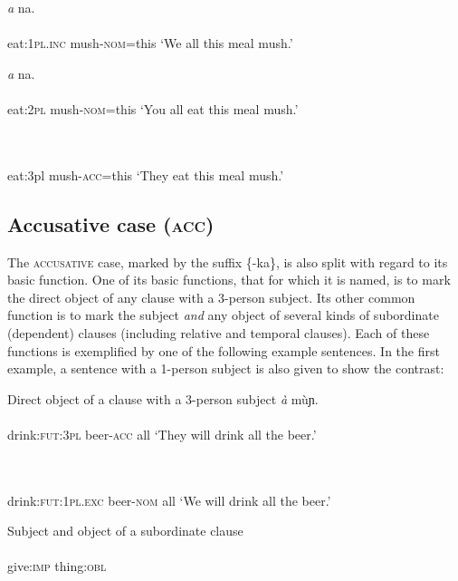 \ea\label{ex:}
\textit{a} na. \\
    \\
eat:\textsc{1pl.inc}   mush-\textsc{nom}=this
\glt ‘We all this meal mush.’ 
\z




\ea\label{ex:}
\textit{a} na. \\
    \\
eat:\textsc{2pl}   mush-\textsc{nom}=this
\glt ‘You all eat this meal mush.’ 
\z




\ea\label{ex:}
 \\
    \\
eat:3pl   mush-\textsc{acc}=this
\glt ‘They eat this meal mush.’ 
\z






\subsection{Accusative case (\textsc{acc})}


The \textsc{accusative} case, marked by the suffix \{-ka\}, is also split with regard to its basic function. One of its basic functions, that for which it is named, is to mark the direct object of any clause with a 3-person subject. Its other common function is to mark the subject \textit{and} any object of several kinds of subordinate (dependent) clauses (including relative and temporal clauses). Each of these functions is exemplified by one of the following example sentences. In the first example, a sentence with a 1-person subject is also given to show the contrast:




Direct object of a clause with a 3-person subject
\ea\label{ex:}
\textit{à}   mùɲ. \\
    \\
drink:\textsc{fut:3pl}   beer-\textsc{acc}   all
\glt ‘They will drink all the beer.’ 
\z




\ea\label{ex:}
 \\
    \\
drink:\textsc{fut:1pl.exc}   beer-\textsc{nom}   all
\glt ‘We will drink all the beer.’ 
\z





Subject and object of a subordinate clause
\ea\label{ex:}
    \\
    \\
give:\textsc{imp}   thing:\textsc{obl}   
\z

